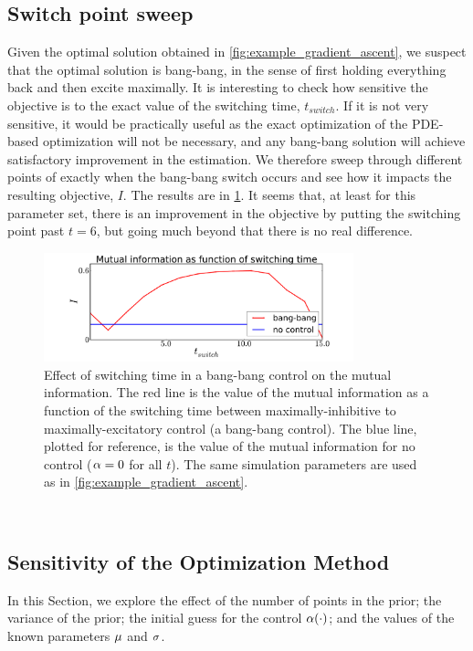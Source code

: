 \documentclass{article}
\begin{document}
\subsection{Switch point sweep}
Given the optimal solution obtained in \cref{fig:example_gradient_ascent}, we suspect
that the optimal solution is bang-bang, in the sense of first holding everything back
and then excite maximally. It is interesting to check how sensitive the
objective is to the exact value of the switching time, $t_{switch}$. If it is
not very sensitive, it would be practically useful as the exact
optimization of the PDE-based optimization will not be
necessary, and any bang-bang solution will achieve satisfactory
improvement in the estimation. 
We therefore sweep through different points of exactly when the
bang-bang switch occurs and see how it impacts the resulting objective, $I$.
The results are in \cref{fig:sweep_switchtime}. It seems that, at least for this
parameter set, there is an improvement in the objective by putting the switching
point past $t=6$, but going much beyond that there is no real
difference. 

\begin{figure}[htp]
\begin{center}
  \includegraphics[width=0.8\textwidth]{Figs/AdjointOptimizer/SweepSwitchpoint_wide.pdf}
  \caption[Effect of Switching time on Mutual Info Objective]{Effect of
  switching time in a bang-bang control on the mutual information. The
  red line is the value of the mutual information as a function of the switching
  time between maximally-inhibitive to maximally-excitatory control (a bang-bang
  control). The blue line, plotted for reference, is the value of the
  mutual information for no control (${\alpha}=0$ for all $t$). The same
  simulation parameters are used as in \cref{fig:example_gradient_ascent}. }
  \label{fig:sweep_switchtime}
\end{center}
\end{figure}

\

\subsection{Sensitivity of the Optimization Method} 
In this Section, we explore the effect of the number of points
in the prior; the variance of the prior; the initial
guess for the control ${\alpha}(\cdot)$; and the values of the known
parameters ${\mu }$ and ${\sigma }$. 
\end{document}
